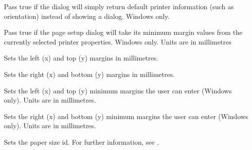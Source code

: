 \label{wxpagesetupdialogdatasetdefaultinfo}


Pass true if the dialog will simply return default printer information (such as orientation)
instead of showing a dialog. Windows only.

\label{wxpagesetupdialogdatasetdefaultminmargins}


Pass true if the page setup dialog will take its minimum margin values from the currently
selected printer properties. Windows only. Units are in millimetres

\label{wxpagesetupdialogdatasetmargintopleft}


Sets the left (x) and top (y) margins in millimetres.

\label{wxpagesetupdialogdatasetmarginbottomright}


Sets the right (x) and bottom (y) margins in millimetres.

\label{wxpagesetupdialogdatasetminmargintopleft}


Sets the left (x) and top (y) minimum margins the user can enter (Windows only). Units are
in millimetres.

\label{wxpagesetupdialogdatasetminmarginbottomright}


Sets the right (x) and bottom (y) minimum margins the user can enter (Windows only). Units are
in millimetres.

\label{wxpagesetupdialogdatasetpaperid}


Sets the paper size id. For further information, see .

